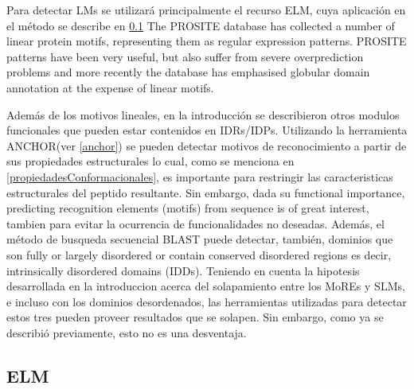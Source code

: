 Para detectar LMs se utilizará principalmente el recurso ELM, cuya aplicación en el método se describe en \ref{elm}
The PROSITE database has collected a number of linear protein motifs, representing them as regular expression patterns. 
PROSITE patterns have been very useful, but also suffer from severe overprediction problems and more recently the database has emphasised globular domain annotation at the expense of linear motifs.




Además de los motivos lineales, en la introducción se describieron otros modulos funcionales que pueden estar contenidos en IDRs/IDPs.
Utilizando la herramienta ANCHOR(ver \ref{anchor}) se pueden detectar motivos de reconocimiento a partir de sus propiedades estructurales lo cual, como se menciona en \ref{propiedadesConformacionales}, es importante para restringir las 
caracteristicas estructurales del peptido resultante. Sin embargo, dada su functional importance, predicting recognition elements (motifs) from sequence is of great interest, tambien para evitar la ocurrencia de funcionalidades no deseadas.
Además, el método de busqueda secuencial BLAST puede detectar, también, dominios que son fully or largely disordered or contain conserved disordered regions es decir, intrinsically disordered domains (IDDs).
Teniendo en cuenta la hipotesis desarrollada en la introduccion acerca del solapamiento entre los MoREs y SLMs, e incluso con los dominios desordenados, las herramientas utilizadas para detectar estos tres pueden proveer resultados que se solapen.
Sin embargo, como ya se describió previamente, esto no es una desventaja.








\subsection{ELM}\label{elm}

